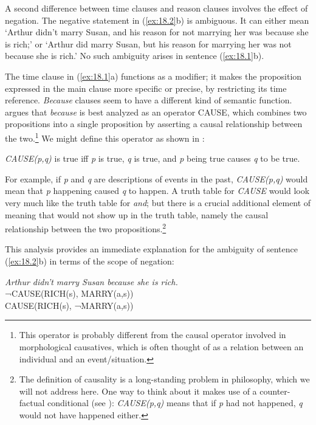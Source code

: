 A second difference between time clauses and reason clauses involves the effect of negation. The negative statement in (\ref{ex:18.2}b) is ambiguous. It can either mean ‘Arthur didn’t marry Susan, and his reason for not marrying her was because she is rich;’ or ‘Arthur did marry Susan, but his reason for marrying her was not because she is rich.’ No such ambiguity arises in sentence (\ref{ex:18.1}b).



The time clause in (\ref{ex:18.1}a) functions as a modifier; it makes the proposition expressed in the main clause more specific or precise, by restricting its time reference. \textit{Because} clauses seem to have a different kind of semantic function. \citet{Johnston1994} argues that \textit{because} is best analyzed as an operator CAUSE, which combines two propositions into a single proposition by asserting a causal relationship between the two.\footnote{This operator is probably different from the causal operator involved in morphological causatives, which is often thought of as a relation between an individual and an event/situation.} We might define this operator as shown in :


\ea \label{ex:18.4}
\textit{CAUSE(p,q)} is true iff \textit{p} is true, \textit{q} is true, and \textit{p} being true causes \textit{q} to be true.
\z


For example, if \textit{p} and \textit{q} are descriptions of events in the past, \textit{CAUSE(p,q)} would mean that \textit{p} happening caused \textit{q} to happen. A truth table for \textit{CAUSE} would look very much like the truth table for \textit{and}; but there is a crucial additional element of meaning that would not show up in the truth table, namely the causal relationship between the two propositions.\footnote{The definition of causality is a long-standing problem in philosophy, which we will not address here. One way to think about it makes use of a counter-factual conditional (see ): \textit{CAUSE(p,q)} means that if \textit{p} had not happened, \textit{q} would not have happened either.}



This analysis provides an immediate explanation for the ambiguity of sentence (\ref{ex:18.2}b) in terms of the scope of negation:


\ea \label{ex:18.5}
  \textit{Arthur didn’t marry Susan because she is rich.}\\
\ea  ¬CAUSE(RICH(s), MARRY(a,s))\\
\ex CAUSE(RICH(s), ¬MARRY(a,s))
                       \z
\z


